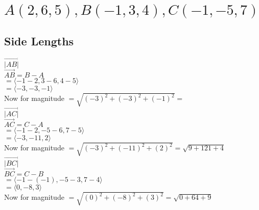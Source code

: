 \documentclass{article}
\begin{document}
\section{$A(2, 6, 5), B(-1, 3, 4), C(-1, -5, 7)$}
\subsection{Side Lengths}
\textbf{$\vec{|AB|}$}
\\[0.1in] $\vec{AB} = B-A$
\\[0.1in] $=\langle-1-2,3-6,4-5\rangle$
\\[0.1in] $=\langle-3,-3,-1\rangle$
\\[0.1in] Now for magnitude $=\sqrt{(-3)^2+(-3)^2+(-1)^2} =$ 
\\[0.1in]\textbf{$\vec{|AC|}$}
\\[0.1in] $\vec{AC} = C-A$
\\[0.1in] $=\langle-1-2,-5-6,7-5\rangle$
\\[0.1in] $=\langle-3,-11,2\rangle$
\\[0.1in] Now for magnitude $=\sqrt{(-3)^2+(-11)^2+(2)^2} =\sqrt{9+121+4}$ 
\\[0.1in]\textbf{$\vec{|BC|}$}
\\[0.1in] $\vec{BC} = C-B$
\\[0.1in] $=\langle-1-(-1),-5-3,7-4\rangle$
\\[0.1in] $=\langle0,-8,3\rangle$
\\[0.1in] Now for magnitude $=\sqrt{(0)^2+(-8)^2+(3)^2} =\sqrt{0+64+9}$ 
\end{document}
